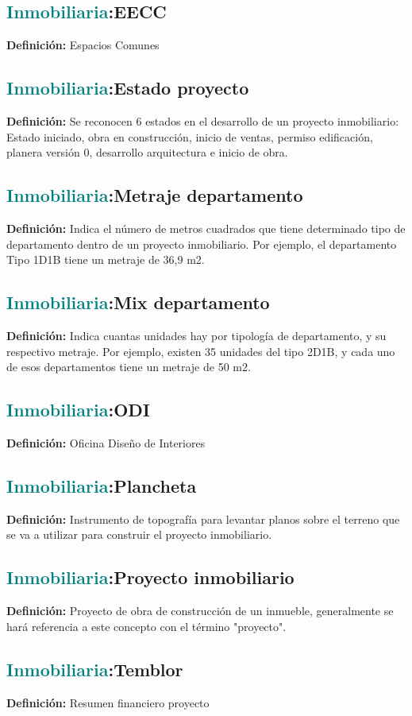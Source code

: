 \documentclass[12pt]{article}
\begin{document}
\subsection{\textcolor{teal}{Inmobiliaria}:{EECC}}
\textbf{Definición:} Espacios Comunes
\subsection{\textcolor{teal}{Inmobiliaria}:{Estado proyecto}}
\textbf{Definición:} Se reconocen 6 estados en el desarrollo de un proyecto inmobiliario: Estado iniciado, obra en construcción, inicio de ventas, permiso edificación, planera versión 0, desarrollo arquitectura e inicio de obra.
\subsection{\textcolor{teal}{Inmobiliaria}:{Metraje departamento}}
\textbf{Definición:} Indica el número de metros cuadrados que tiene determinado tipo de departamento dentro de un proyecto inmobiliario. Por ejemplo, el departamento Tipo 1D1B tiene un metraje de 36,9 m2.
\subsection{\textcolor{teal}{Inmobiliaria}:{Mix departamento}}
\textbf{Definición:} Indica cuantas unidades hay por tipología de departamento, y su respectivo metraje. Por ejemplo, existen 35 unidades del tipo 2D1B, y cada uno de esos departamentos tiene un metraje de 50 m2.
\subsection{\textcolor{teal}{Inmobiliaria}:{ODI}}
\textbf{Definición:} Oficina Diseño de Interiores
\subsection{\textcolor{teal}{Inmobiliaria}:{Plancheta}}
\textbf{Definición:} Instrumento de topografía para levantar planos sobre el terreno que se va a utilizar para construir el proyecto inmobiliario.
\subsection{\textcolor{teal}{Inmobiliaria}:{Proyecto inmobiliario}}
\textbf{Definición:} Proyecto de obra de construcción de un inmueble, generalmente se hará referencia a este concepto con el término "proyecto".
\subsection{\textcolor{teal}{Inmobiliaria}:{Temblor}}
\textbf{Definición:} Resumen financiero proyecto
\end{document}
